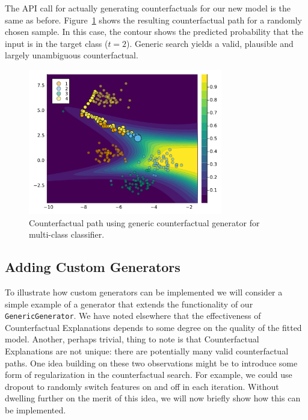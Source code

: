 \documentclass{juliacon}
\begin{document}
The API call for actually generating counterfactuals for our new model
is the same as before. Figure~\ref{fig-multi} shows the resulting
counterfactual path for a randomly chosen sample. In this case, the
contour shows the predicted probability that the input is in the target
class (\(t=2\)). Generic search yields a valid, plausible and largely
unambiguous counterfactual.

\begin{figure}

{\centering \includegraphics[width=3.33333in,height=2.5in]{www/ce_multi.png}

}

\caption{\label{fig-multi}Counterfactual path using generic
counterfactual generator for multi-class classifier.}

\end{figure}

\hypertarget{sec-custom-gen}{%
\subsection{Adding Custom Generators}\label{sec-custom-gen}}

To illustrate how custom generators can be implemented we will consider
a simple example of a generator that extends the functionality of our
\texttt{GenericGenerator}. We have noted elsewhere that the
effectiveness of Counterfactual Explanations depends to some degree on
the quality of the fitted model. Another, perhaps trivial, thing to note
is that Counterfactual Explanations are not unique: there are
potentially many valid counterfactual paths. One idea building on these
two observations might be to introduce some form of regularization in
the counterfactual search. For example, we could use dropout to randomly
switch features on and off in each iteration. Without dwelling further
on the merit of this idea, we will now briefly show how this can be
implemented.
\end{document}
